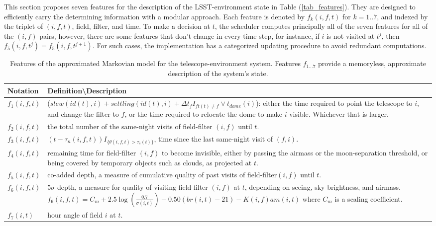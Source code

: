 \documentclass[12pt]{aastex62}
\theoremstyle{definition}
\begin{document}
This section proposes seven features for the description of the LSST-environment state in Table (\ref{tab_features}). They are designed to efficiently carry the determining information with a modular approach. Each feature is denoted by $f_k(i,f,t)$ for $k= 1..7$, and indexed by the triplet of $(i,f,t)$, field, filter, and time. To make a decision at $t$, the scheduler computes principally all of the seven features for all of the $(i,f)$ pairs, however, there are some features that don't change in every time step, for instance, if $i$ is not visited at $t^j$, then $f_5(i,f,t^j)= f_5(i,f,t^{j+1})$. For such cases, the implementation has a categorized updating procedure to avoid redundant computations.

\begin{table}
\caption{Features of the approximated Markovian model for the telescope-environment system. Features $f_{1\dots 7}$ provide a memoryless, approximate description of the system's state.}
\begin{tabularx}{\textwidth}{|l|X|}
\hline
Notation & Definition\textbackslash Description\\ \hline \hline 
$f_1(i,f,t)$ & ($slew(id(t),i)+settling(id(t),i)+\Delta t_{f} I_{ft(t) \neq f} \vee t_{dome}(i)$): either the time required to point the telescope to $i$, and change the filter to $f$, or the time required to relocate the dome to make $i$ visible. Whichever that is larger.\\ \hline
$f_2(i,f,t)$ &  the total number of the same-night visits of field-filter $(i,f)$ until $t$.\\ \hline
$f_3(i,f,t)$ &  $(t - \tau_n(i,f,t)) I_{\{\theta(i,f,t) > \tau_s(t)\}}$, time since the last same-night visit of $(f,i).$\\ \hline
$f_4(i,f,t)$ &  remaining time for field-filter $(i,f)$ to become invisible, either by passing the airmass or the moon-separation threshold, or being covered by temporary objects such as clouds, as projected at $t$.\\ \hline
$f_5(i,f,t)$ &  co-added depth, a measure of cumulative quality of past visits of field-filter$(i,f)$ until $t$.\\ \hline
$f_6(i,f,t)$ &  $5\sigma$-depth, a measure for quality of visiting field-filter $(i,f)$ at $t$, depending on seeing, sky brightness, and airmass. $f_6(i,f,t) = C_m + 2.5 \log (\frac{0.7}{\sigma(i,t)}) + 0.50 (br(i,t)-21) - K(i,f) am(i,t)$ where $C_m$ is a scaling coefficient.\\ \hline
$f_7(i,t)$  & hour angle of field $i$ at $t$.\\ \hline
\hline
\end{tabularx}
\end{table}\label{tab_features}
\end{document}
